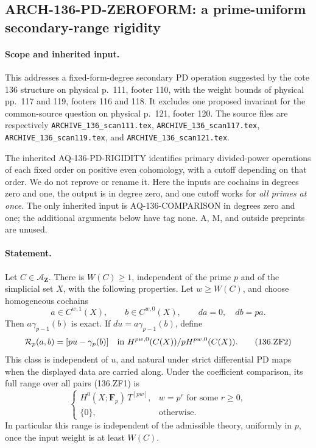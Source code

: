 \subsection{ARCH-136-PD-ZEROFORM: a prime-uniform secondary-range rigidity}
\label{sec:arch136pdzeroform}

\paragraph{Scope and inherited input.}
This addresses a fixed-form-degree secondary PD operation suggested
by the cote 136 structure on physical p.~111, footer 110, with the
weight bounds of physical pp.~117 and 119, footers 116 and 118.
It excludes one proposed invariant for the common-source question
on physical p.~121, footer 120. The source files are respectively
\texttt{ARCHIVE\_136\_scan111.tex},
\texttt{ARCHIVE\_136\_scan117.tex},
\texttt{ARCHIVE\_136\_scan119.tex}, and
\texttt{ARCHIVE\_136\_scan121.tex}.

The inherited AQ-136-PD-RIGIDITY identifies primary divided-power
operations of each fixed order on positive even cohomology, with
a cutoff depending on that order. We do not reprove or rename it.
Here the inputs are cochains in degrees zero and one, the output
is in degree zero, and one cutoff works for \emph{all primes at
once}. The only inherited input is AQ-136-COMPARISON in degrees
zero and one; the additional arguments below have tag none.
A, M, and outside preprints are unused.

\paragraph{Statement.}
Let \(C\in\mathcal A_{\mathbf Z}\). There is \(W(C)\geq1\), independent
of the prime \(p\) and of the simplicial set \(X\), with the following
properties. Let \(w\geq W(C)\), and choose homogeneous cochains
\[
 a\in C^{w,1}(X),\qquad b\in C^{w,0}(X),\qquad
                         da=0,\quad db=p a .
 \tag{136.ZF1}
\]
Then \(a\gamma_{p-1}(b)\) is exact. If
\(du=a\gamma_{p-1}(b)\), define
\[
 \mathcal R_p(a,b)=
       [p u-\gamma_p(b)]
   \quad\hbox{in }H^{pw,0}(C(X))/pH^{pw,0}(C(X)).
 \tag{136.ZF2}
\]
This class is independent of \(u\), and natural under strict
differential PD maps when the displayed data are carried along.
Under the coefficient comparison, its full range over all pairs
(136.ZF1) is
\[
 \begin{cases}
  H^0(X;\mathbf F_p)\,T^{[pw]},& w=p^r\text{ for some }r\geq0,\\
  \{0\},&\text{otherwise}.
 \end{cases}
 \tag{136.ZF3}
\]
In particular this range is independent of the admissible theory,
uniformly in \(p\), once the input weight is at least \(W(C)\).


